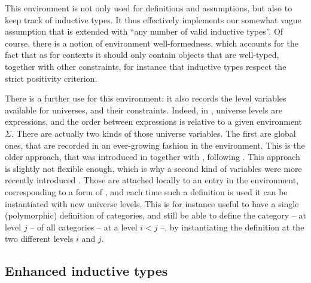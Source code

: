 This environment is not only used for definitions and assumptions,
but also to keep track of inductive types.
It thus effectively implements our somewhat vague assumption that
 is extended with “any number of valid inductive types”. Of course, there is a notion
of environment well-formedness, which accounts for the fact that as for contexts it should
only contain objects that are well-typed, together with other constraints, for instance
that inductive types respect the strict positivity criterion.

There is a further use for this environment: it also records the level variables available for
universes, and their constraints. Indeed, in , universe levels are expressions,
and the order between expressions is relative to a given environment $\Sigma$.
There are actually two kinds of those universe variables.
The first are global ones, that are recorded in an ever-growing fashion in the environment.
This is the older approach, that was introduced in  together with , following .
This approach is slightly not flexible enough, which is why a second kind of variables
were more recently introduced . Those are attached locally to
an entry in the environment, corresponding to a form of ,
and each time such a definition is used it can be instantiated with new universe levels.%
This is for instance useful to have a single (polymorphic) definition of categories,
and still be able to define the category – at level $j$ – of all categories
– at a level $i < j$ –, by instantiating the definition at the two different levels $i$ and $j$.

\subsection{Enhanced inductive types}
\label{sec:pcuic-ind}

